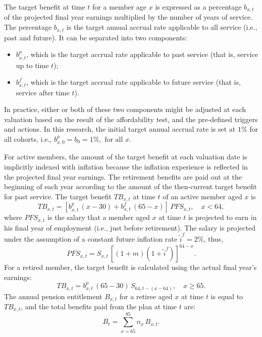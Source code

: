\documentclass{sfuthesis}
\numberwithin{equation}{chapter}
\begin{document}
		\justify
		The target benefit at time $t$ for a member age $x$ is expressed as a percentage $b_{x,t}$ of the projected final year earnings multiplied by the number of years of service. The percentage $b_{x,t}$ is the target annual accrual rate applicable to all service (i.e., past and future). It can be separated into two components: 
		\begin{itemize}
			\item $b_{x,t}^p$, which is the target accrual rate applicable to past service (that is, service up to time $t$);
			\item $b_{x,t}^f$, which is the target accrual rate applicable to future service (that is, service after time $t$).
		\end{itemize}
		
		\justify
		In practice, either or both of these two components might be adjusted at each valuation based on the result of the affordability test, and the pre-defined triggers and actions. In this research, the initial target annual accrual rate is set at $1\%$ for all cohorts, i.e., $b_{x,0}^p = b_0 = 1\%, \text{ for all } x$.
		
		
		\justify
		For active members, the amount of the target benefit at each valuation date is implicitly indexed with inflation because the inflation experience is reflected in the projected final year earnings. The retirement benefits are paid out at the beginning of each year according to the amount of the then-current target benefit for past service. The target benefit $TB_{x,t}$ at time $t$ of an active member aged $x$ is
		\begin{equation}
		\label{eq:STBP_8}
		TB_{x,t} =  \left[ b_{x,t}^p\, (x-30) + b_{x,t}^f \,(65-x)\right] \, PFS_{x,t}, \quad x<64,
		\end{equation}
		where $PFS_{x,t}$ is the salary that a member aged $x$ at time $t$ is projected to earn in his final year of employment (i.e., just before retirement). The salary is projected under the assumption of a constant future inflation rate $\tilde{i}^{f} = 2\%$, thus,
		\begin{equation}
		\label{eq:STBP_9}
		PFS_{x,t} = S_{x,t}\,\left[(1+m) (1+\tilde{i}^f)\right]^{64-x}.
		\end{equation}
		For a retired member, the target benefit is calculated using the actual final year's earnings: 
		\begin{equation}
		\label{eq:STBP_10}
		TB_{x,t} = b_{x,t}^{p} \,(65-30) \, S_{64,t-(x-64)},\quad x\geqslant 65.
		\end{equation}
		The annual pension entitlement $B_{x,t}$ for a retiree aged $x$ at time $t$ is equal to $TB_{x,t}$, and the total benefits paid from the plan at time $t$ are:
		\begin{equation}
		\label{eq:STBP_11}
		B_{t} = \sum_{x= 65}^{85} n_x \, B_{x,t}.
		\end{equation}
\end{document}

